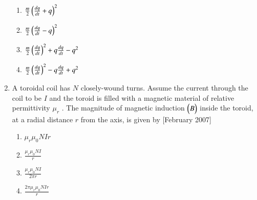 \documentclass[journal]{IEEEtran}
\begin{document}
\begin{enumerate}
\begin{enumerate}
\item $  \frac{m}{2} \left( \frac{dq}{dt} + q \right)^2 $ 
\item $  \frac{m}{2} \left( \frac{dq}{dt} - q \right)^2 $
\item $  \frac{m}{2} \left( \frac{dq}{dt} \right)^2 + q \frac{dq}{dt} - q^2 $
\item $  \frac{m}{2} \left( \frac{dq}{dt} \right)^2 - q \frac{dq}{dt} + q^2 $
\end{enumerate}
\item A toroidal coil has  $N$  closely-wound turns. Assume the current through the coil to be $I$ and the toroid is filled with a magnetic material of relative permittivity $ \mu_r$ . The magnitude of magnetic induction $\begin{pmatrix}B\end{pmatrix} $ inside the toroid, at a radial distance $r$  from the axis, is given by \hfill[February 2007]

\begin{enumerate}
\item $  \mu_r \mu_0 NIr $
\item $ \frac{\mu_r \mu_0 NI}{r} $
\item $  \frac{\mu_r \mu_0 NI}{2 \pi r} $
\item $ \frac{2 \pi \mu_r \mu_0 NIr}{r} $
\end{enumerate}




\end{enumerate}
\end{document}
